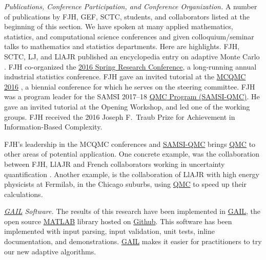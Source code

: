\documentclass[11pt]{NSFamsart}
\newcommand{\GAIL}{\hyperlink{GAILlink}{GAIL}\xspace}
\newcommand{\QMC}{\hyperlink{QMClink}{QMC}\xspace}
\newcommand{\SAMSIQMC}{\hyperlink{SAMSIlink}{SAMSI-QMC}\xspace}
\newcommand{\MATLAB}{\hyperlink{MATLABlink}{MATLAB}\xspace}
\newcommand{\Rlang}{\hyperlink{Rlink}{R}\xspace}
\begin{document}
\emph{Publications, Conference Participation, and Conference Organization.} A number of publications by FJH, GEF, SCTC, students, and collaborators listed at the beginning of this section.  We have spoken at many applied mathematics, statistics, 
and computational science conferences and given colloquium/seminar talks to mathematics and 
statistics departments.  Here are highlights.  FJH, SCTC, LJ, and LlAJR published  an 
encyclopedia entry on adaptive Monte Carlo \cite{HicEtal18a}.  FJH co-organized the 
\href{http://cos.iit.edu/2016-spring-research-conference/}{2016 Spring Research 
Conference}, a long-running annual industrial statistics conference.   FJH gave an invited tutorial 
at the \href{http://mcqmc2016.stanford.edu}{MCQMC 2016} 
\cite{Hic17a}, a biennial conference for which he serves on the steering committee.  FJH 
was a program leader for the SAMSI 2017--18 
\href{https://www.samsi.info/programs-and-activities/year-long-research-programs/2017-18-program-quasi-monte-carlo-high-dimensional-sampling-methods-applied-mathematics-qmc/
}{\QMC Program (\hypertarget{SAMSIlink}{SAMSI-QMC})}.   He  gave an invited tutorial 
	at the Opening Workshop, and led one of 
	the working groups.  FJH received the 2016 Joseph F.\ Traub 
	Prize for Achievement in Information-Based Complexity.
	
	
FJH's leadership in the MCQMC conferences  and \SAMSIQMC brings \QMC to other areas of potential application.  One concrete example, was the 
	collaboration between FJH, LlAJR and French collaborators working in uncertainty quantification \cite{GilEtal16a, GilJim16b}.  Another example, is the collaboration of LlAJR with
	high energy physicists at Fermilab, in the Chicago suburbs, using \QMC to speed 
	up their calculations.
	
\emph{\GAIL Software.} The results of this research have been implemented in 
\GAIL, the open source \MATLAB library hosted on
\href{http://gailgithub.github.io/GAIL_Dev/} {Github}. This software 
has been implemented with input parsing, input validation, unit tests, inline documentation, and 
demonstrations.  \GAIL makes it easier for practitioners to try our new adaptive algorithms.  
\end{document}
